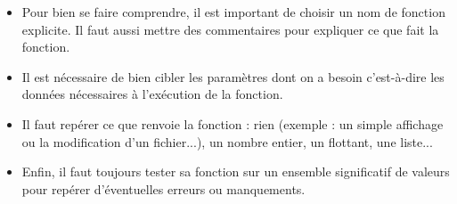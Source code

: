 \begin{remarque}

\begin{itemize}
	\item Pour bien se faire comprendre, il est important de choisir un nom de fonction 
explicite. 
Il faut aussi mettre des commentaires pour expliquer ce que fait la fonction.
	\item Il est nécessaire de bien cibler les paramètres dont on a besoin 
c'est-à-dire les données nécessaires à l'exécution de la fonction.
	\item Il faut repérer ce que renvoie la fonction : rien (exemple : un simple affichage ou 
la modification d'un fichier...), un nombre entier, 
un flottant, une liste...
%
%
%
%
%
%

	\item Enfin, il faut toujours tester sa fonction sur un ensemble significatif de valeurs 
pour repérer d'éventuelles erreurs ou manquements.
\end{itemize}
\end{remarque} 

